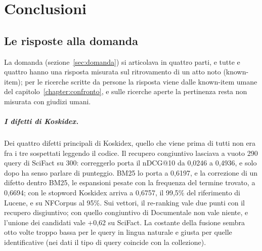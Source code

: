 \chapter{Conclusioni}\label{chapter:conclusione}

\section{Le risposte alla domanda}\label{sec:risposte}

La domanda (sezione~\ref{sec:domanda}) si articolava in quattro parti, e
tutte e quattro hanno una risposta misurata sul ritrovamento di un atto noto
(known-item); per le ricerche scritte da persone la risposta viene dalle
known-item umane del capitolo~\ref{chapter:confronto}, e sulle ricerche aperte la
pertinenza resta non misurata con giudizi umani.

\paragraph{I difetti di Koskidex.} Dei quattro difetti principali di Koskidex, quello che
viene prima di tutti non era fra i tre sospettati leggendo il codice. Il recupero congiuntivo
lasciava a vuoto 290 query di SciFact su 300: correggerlo porta il nDCG@10 da
0,0246 a 0,4936, e solo dopo ha senso parlare di punteggio. BM25 lo porta a
0,6197, e la correzione di un difetto dentro BM25, le espansioni pesate con la
frequenza del termine trovato, a 0,6694; con le stopword Koskidex arriva a
0,6757, il 99,5\% del riferimento di Lucene, e su NFCorpus al 95\%. Sui vettori, il
re-ranking vale due punti con il recupero disgiuntivo; con quello congiuntivo di
Documentale non vale niente, e l'unione dei candidati vale +0,62 su SciFact. La
costante della fusione sembra otto volte troppo bassa per le query in lingua naturale
e giusta per quelle identificative (nei dati il tipo di query coincide con la
collezione).


